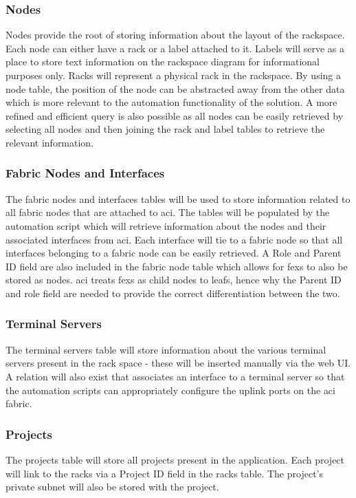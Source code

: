 \subsubsection{Nodes}
\label{design:web-application:database:nodes}
Nodes provide the root of storing
information about the layout of the rackspace. Each node can either have a rack
or a label attached to it. Labels will serve as a place to store text
information on the rackspace diagram for informational purposes only. Racks
will represent a physical rack in the rackspace. By using a node table, the
position of the node can be abstracted away from the other data which is more
relevant to the automation functionality of the solution. A more refined and efficient query is also
possible as all nodes can be easily retrieved by selecting all nodes and then
joining the rack and label tables to retrieve the relevant information.

\subsubsection{Fabric Nodes and Interfaces}
\label{design:web-application:database:fabric-nodes-and-interfaces}
The fabric
nodes and interfaces tables will be used to store information related to all
fabric nodes that are attached to \gls{aci}. The tables will be populated by the automation script which will retrieve information about the
nodes and their associated interfaces from \gls{aci}. Each interface will tie
to a fabric node so that all interfaces belonging to a fabric node can be
easily retrieved. A Role and Parent ID field are also included in the fabric
node table which allows for \gls{fex}s to also be stored as nodes. \gls{aci}
treats \gls{fex}s as child nodes to leafs, hence why the Parent ID and role
field are needed to provide the correct differentiation between the two.

\subsubsection{Terminal Servers}
\label{design:web-application:database:terminal-servers}
The terminal servers
table will store information about the various terminal servers present in the
rack space - these will be inserted manually via the web UI. A relation will
also exist that associates an interface to a terminal server so that the
automation scripts can appropriately configure the uplink ports on the
\gls{aci} fabric.

\subsubsection{Projects}
\label{design:web-application:database:projects}
The projects table will store
all projects present in the application. Each project will link to the racks
via a Project ID field in the racks table. The project's private subnet will
also be stored with the project.

